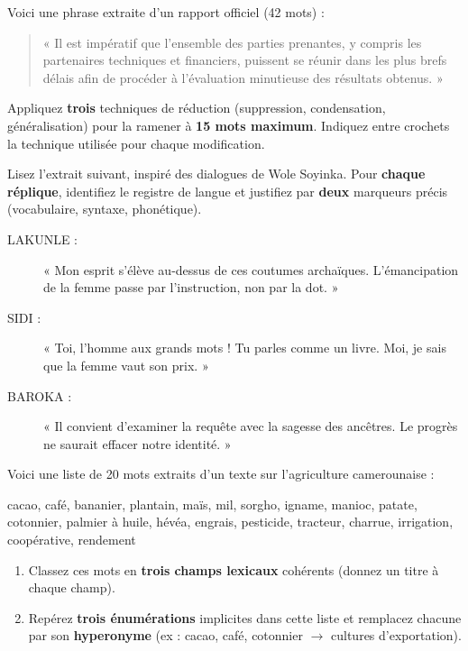 \documentclass[11pt]{article}
\newcounter{popsec}
\newcounter{popsub}
\newcommand{\courssub}[1]{%
  \stepcounter{popsub}%
  \par\vspace{9pt}\noindent{\popxbold\fontsize{11.5}{13}\selectfont\color{popink}{\color{poporange}\thepopsec.\thepopsub}\hspace{6pt}#1}\par\nopagebreak\vspace{4pt}
}
\begin{document}
\begin{exercice}
Voici une phrase extraite d'un rapport officiel (42 mots) :
\begin{quote}
« Il est impératif que l'ensemble des parties prenantes, y compris les partenaires techniques et financiers, puissent se réunir dans les plus brefs délais afin de procéder à l'évaluation minutieuse des résultats obtenus. »
\end{quote}
Appliquez \textbf{trois} techniques de réduction (suppression, condensation, généralisation) pour la ramener à \textbf{15 mots maximum}. Indiquez entre crochets la technique utilisée pour chaque modification.
\end{exercice}

\courssub{Je m'entraîne}

\begin{exercice}
Lisez l'extrait suivant, inspiré des dialogues de Wole Soyinka. Pour \textbf{chaque réplique}, identifiez le registre de langue et justifiez par \textbf{deux} marqueurs précis (vocabulaire, syntaxe, phonétique).

\begin{description}
    \item[LAKUNLE :] « Mon esprit s'élève au-dessus de ces coutumes archaïques. L'émancipation de la femme passe par l'instruction, non par la dot. »
    \item[SIDI :] « Toi, l'homme aux grands mots ! Tu parles comme un livre. Moi, je sais que la femme vaut son prix. »
    \item[BAROKA :] « Il convient d'examiner la requête avec la sagesse des ancêtres. Le progrès ne saurait effacer notre identité. »
\end{description}
\end{exercice}

\begin{exercice}
Voici une liste de 20 mots extraits d'un texte sur l'agriculture camerounaise :
\begin{center}
cacao, café, bananier, plantain, maïs, mil, sorgho, igname, manioc, patate, cotonnier, palmier à huile, hévéa, engrais, pesticide, tracteur, charrue, irrigation, coopérative, rendement
\end{center}

\begin{enumerate}
    \item Classez ces mots en \textbf{trois champs lexicaux} cohérents (donnez un titre à chaque champ).
    \item Repérez \textbf{trois énumérations} implicites dans cette liste et remplacez chacune par son \textbf{hyperonyme} (ex : cacao, café, cotonnier $\rightarrow$ cultures d'exportation).
\end{enumerate}
\end{exercice}
\end{document}

